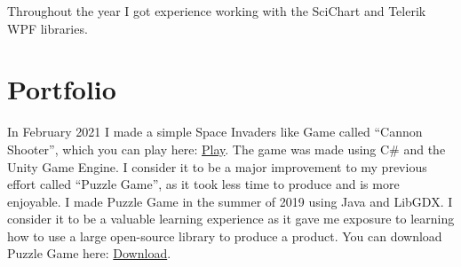 \documentclass[]{twentysecondcv}
\begin{document}
Throughout the year I got experience working with the SciChart and Telerik WPF libraries. 
\section{Portfolio}
In February 2021 I made a simple Space Invaders like Game called ``Cannon Shooter'', which you can play here: \href{https://johnmckane.github.io/CannonShooter/htmlBuild/index.html}{Play}. The game was made using C\# and the Unity Game Engine. I consider it to be a major improvement to my previous effort called ``Puzzle Game'', as it took less time to produce and is more enjoyable.
I made Puzzle Game in the summer of 2019 using Java and LibGDX. I consider it to be a valuable learning experience as it gave me exposure to learning how to use a large open-source library to produce a product.
You can download Puzzle Game here: \href{https://johnmckane.github.io/PuzzleGame/index.html}{Download}.
\end{document}
